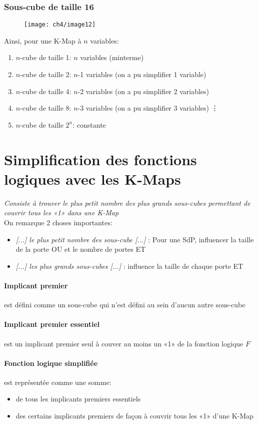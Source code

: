 \subsubsection{Sous-cube de taille 16}
	\begin{figure}[H]
		\centering
		\texttt{[image: ch4/image12]}
	\end{figure}


Ainsi, pour une K-Map à $n$ variables:
\begin{enumerate}
	\item $n$-cube de taille 1: $n$ variables (minterme)
	\item $n$-cube de taille 2: $n$-1 variables (on a pu simplifier 1 variable)
	\item $n$-cube de taille 4: $n$-2 variables (on a pu simplifier 2 variables)
	\item $n$-cube de taille 8: $n$-3 variables (on a pu simplifier 3 variables)
	\vdots
	\item $n$-cube de taille $2^n$: constante
\end{enumerate}
\section{Simplification des fonctions logiques avec les K-Maps}
\textit{Consiste à trouver le plus petit nombre des plus grands sous-cubes permettant de couvrir tous les «1» dans une K-Map}\\
On remarque 2 choses importantes:
\begin{itemize}
	\item \textit{[...] le plus petit nombre des sous-cube [...]} : Pour une SdP, influencer la taille de la porte OU et le nombre de portes ET
	\item \textit{[...] les plus grands sous-cubes [...]} : influence la taille de chaque porte ET
\end{itemize}
\paragraph{Implicant premier} est défini comme un sous-cube qui n'est défini au sein d'aucun autre sous-cube
\paragraph{Implicant premier essentiel} est un implicant premier seul à couver au moins un «1» de la fonction logique $F$

\paragraph{Fonction logique simplifiée} est représentée comme une somme:
\begin{itemize}
	\item de tous les implicants premiers essentiels
	\item des certains implicants premiers de façon à couvrir tous les «1» d'une K-Map
\end{itemize}
